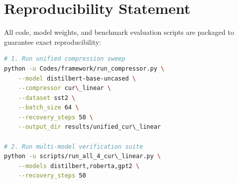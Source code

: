 \section{Reproducibility Statement}
All code, model weights, and benchmark evaluation scripts are packaged to guarantee exact reproducibility:
\begin{lstlisting}[language=bash]
# 1. Run unified compression sweep
python -u Codes/framework/run_compressor.py \
    --model distilbert-base-uncased \
    --compressor cur\_linear \
    --dataset sst2 \
    --batch_size 64 \
    --recovery_steps 50 \
    --output_dir results/unified_cur\_linear

# 2. Run multi-model verification suite
python -u scripts/run_all_4_cur\_linear.py \
    --models distilbert,roberta,gpt2 \
    --recovery_steps 50
\end{lstlisting}
